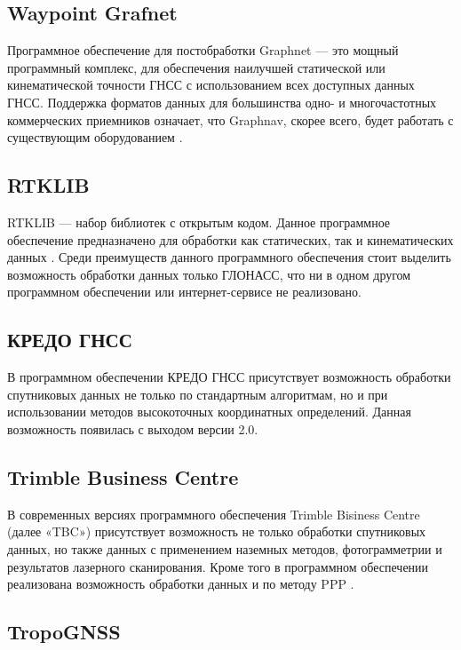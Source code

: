 \subsection{Waypoint Grafnet} \label{subsec:ch2/sec2/sub3}

Программное обеспечение для постобработки Graphnet --- это мощный программный комплекс, для обеспечения наилучшей статической или кинематической точности ГНСС с использованием всех доступных данных ГНСС. Поддержка форматов данных для большинства одно- и многочастотных коммерческих приемников означает, что Graphnav, скорее всего, будет работать с существующим оборудованием \cite{src67}.

\subsection{RTKLIB} \label{subsec:ch2/sec2/sub4}

RTKLIB --- набор библиотек с открытым кодом. Данное программное обеспечение предназначено для обработки как статических, так и кинематических данных \cite{src72}. Среди преимуществ данного программного обеспечения стоит выделить возможность обработки данных только ГЛОНАСС, что ни в одном другом программном обеспечении или интернет-сервисе не реализовано.  

\subsection{КРЕДО ГНСС} \label{subsec:ch2/sec2/sub5}

В программном обеспечении КРЕДО ГНСС присутствует возможность обработки спутниковых данных не только по стандартным алгоритмам, но и при использовании методов высокоточных координатных определений. Данная возможность появилась с выходом версии 2.0.

\subsection{Trimble Business Centre}\label{subsec:ch2/sec2/sub6}

В современных версиях программного обеспечения Trimble Bisiness Centre (далее «TBC») присутствует возможность не только обработки спутниковых данных, но также данных с применением наземных методов, фотограмметрии и результатов лазерного сканирования. Кроме того в программном обеспечении реализована возможность обработки данных и по методу PPP \cite{src65,src67}.

\subsection{TropoGNSS}\label{subsec:ch2/sec2/sub7}

